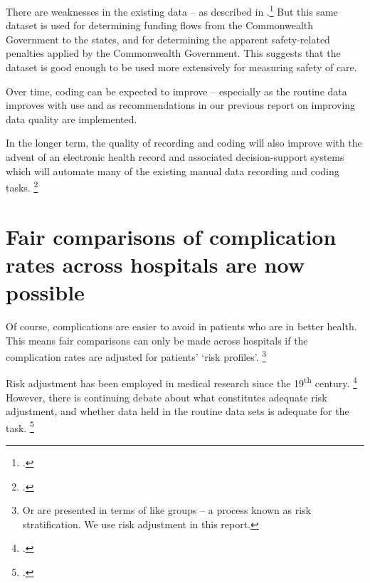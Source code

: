 \documentclass[FrontPage]{grattan}
\begin{document}
	There are weaknesses in the existing data -- as described in .\footcite{DuckettEtAl-2017-Strengthening-safety-statistics}
But this same dataset is used for determining funding flows from the Commonwealth Government to the states, and for determining the apparent safety-related penalties applied by the Commonwealth Government.
This suggests that the dataset is good enough to be used more extensively for measuring safety of care.

Over time, coding can be expected to improve -- especially as the routine data improves with use and as recommendations in our previous report on improving data quality are implemented.

In the longer term, the quality of recording and coding will also improve with the advent of an electronic health record and associated decision-support systems which will automate many of the existing manual data recording and coding tasks.%
	\footcites{Stanfill_2010}{Scheurwegs_2017}{berndorfer2017automated}

\section{Fair comparisons of complication rates across hospitals are now possible}\label{sec:fair-comparisons-of-complications-rates-across-hospitals-are-now-possible}

Of course, complications are easier to avoid in patients who are in better health.
This means fair comparisons can only be made across hospitals if the complication rates are adjusted for patients' `risk profiles'.%
	\footnote{Or are presented in terms of like groups -- a process known as risk stratification.
	We use risk adjustment in this report.}

Risk adjustment has been employed in medical research since the 19\textsuperscript{th} century.%
	\footcites{iezzoni1996apples}{iezzoni1997risks}
However, there is continuing debate about what constitutes adequate risk adjustment, and whether data held in the routine data sets is adequate for the task.%
	\footcite{alexander2017risks}
\end{document}
